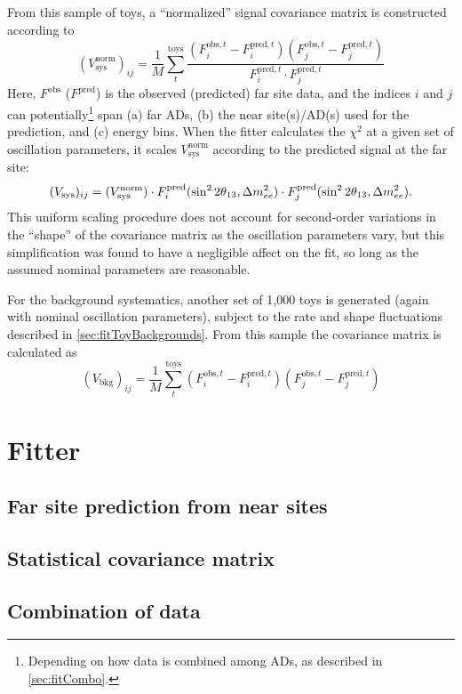 \documentclass[../thesis.tex]{subfiles}
\begin{document}
From this sample of toys, a ``normalized'' signal covariance matrix is
constructed according to
\begin{equation*}
  (V^{\mathrm{norm}}_{\mathrm{sys}})_{ij} = \frac{1}{M} \sum_t^{\mathrm{toys}}
  \frac{(F^{\mathrm{obs},t}_i - F^{\mathrm{pred},t}_i)(F^{\mathrm{obs},t}_j - F^{\mathrm{pred},t}_j)}%
  {F^{\mathrm{pred},t}_i \cdot F^{\mathrm{pred},t}_j}
\end{equation*}
Here, $F^{\mathrm{obs}}$ ($F^{\mathrm{pred}}$) is the observed (predicted) far
site data, and the indices $i$ and $j$ can potentially\footnote{Depending on how
  data is combined among ADs, as described in \autoref{sec:fitCombo}.} span (a)
far ADs, (b) the near site(s)/AD(s) used for the prediction, and (c) energy
bins. When the fitter calculates the $\chi^2$ at a given set of oscillation
parameters, it scales $V^{\mathrm{norm}}_{\mathrm{sys}}$ according to the
predicted signal at the far site:
\begin{equation*}
  (V_{\mathrm{sys}})_{ij} = (V^{\mathrm{norm}}_{\mathrm{sys}}) \cdot F^{\mathrm{pred}}_i(\sin^2 2\theta_{13}, \Delta m^2_{ee})
  \cdot F^{\mathrm{pred}}_j(\sin^2 2\theta_{13}, \Delta m^2_{ee}).
\end{equation*}
This uniform scaling procedure does not account for second-order variations in
the ``shape'' of the covariance matrix as the oscillation parameters vary, but
this simplification was found to have a negligible affect on the fit, so long as
the assumed nominal parameters are reasonable.

For the background systematics, another set of 1,000 toys is generated (again
with nominal oscillation parameters), subject to the rate and shape fluctuations
described in \autoref{sec:fitToyBackgrounds}. From this sample the covariance
matrix is calculated as
\begin{equation*}
  (V_{\mathrm{bkg}})_{ij} = \frac{1}{M} \sum_t^{\mathrm{toys}}
  (F^{\mathrm{obs},t}_i - F^{\mathrm{pred},t}_i)(F^{\mathrm{obs},t}_j - F^{\mathrm{pred},t}_j)
\end{equation*}

\section{Fitter}
\label{sec:fitFitter}

\subsection{Far site prediction from near sites}
\label{sec:fitNearToFarPred}

\subsection{Statistical covariance matrix}
\label{sec:fitStatCovMat}

\subsection{Combination of data}
\label{sec:fitCombo}
\end{document}
